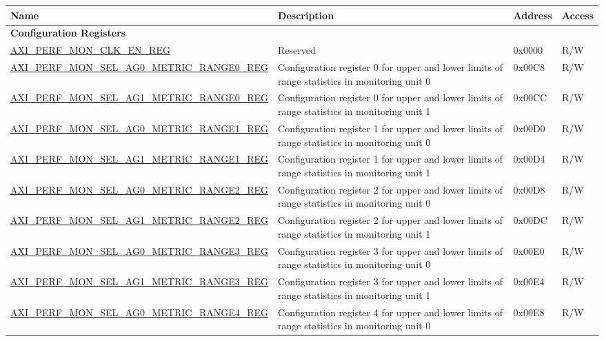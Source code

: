 \begin{longtable}{ | p{9.1cm} | p{5cm} | p{1.3cm} | p{1.4cm} | }
\hline\rowcolor{lightgray}
Name & Description &  Address & Access \\ \hline
\endhead
\multicolumn{4}{|l|}{\textbf{Configuration Registers}} \\ \hline
\hyperref[regdesc:AXIPERFMONCLKENREG]{AXI\_PERF\_MON\_CLK\_EN\_REG} & Reserved & 0x0000 & R/W\\ \hline
\hyperref[regdesc:AXIPERFMONSELAGNMETRICRANGEMREG]{AXI\_PERF\_MON\_SEL\_AG0\_METRIC\_RANGE0\_REG} & Configuration register 0 for upper and lower limits of range statistics in monitoring unit 0 & 0x00C8 & R/W\\ \hline
\hyperref[regdesc:AXIPERFMONSELAGNMETRICRANGEMREG]{AXI\_PERF\_MON\_SEL\_AG1\_METRIC\_RANGE0\_REG} & Configuration register 0 for upper and lower limits of range statistics in monitoring unit 1 & 0x00CC & R/W\\ \hline
\hyperref[regdesc:AXIPERFMONSELAGNMETRICRANGEMREG]{AXI\_PERF\_MON\_SEL\_AG0\_METRIC\_RANGE1\_REG} & Configuration register 1 for upper and lower limits of range statistics in monitoring unit 0 & 0x00D0 & R/W\\ \hline
\hyperref[regdesc:AXIPERFMONSELAGNMETRICRANGEMREG]{AXI\_PERF\_MON\_SEL\_AG1\_METRIC\_RANGE1\_REG} & Configuration register 1 for upper and lower limits of range statistics in monitoring unit 1 & 0x00D4 & R/W\\ \hline
\hyperref[regdesc:AXIPERFMONSELAGNMETRICRANGEMREG]{AXI\_PERF\_MON\_SEL\_AG0\_METRIC\_RANGE2\_REG} & Configuration register 2 for upper and lower limits of range statistics in monitoring unit 0 & 0x00D8 & R/W\\ \hline
\hyperref[regdesc:AXIPERFMONSELAGNMETRICRANGEMREG]{AXI\_PERF\_MON\_SEL\_AG1\_METRIC\_RANGE2\_REG} & Configuration register 2 for upper and lower limits of range statistics in monitoring unit 1 & 0x00DC & R/W\\ \hline
\hyperref[regdesc:AXIPERFMONSELAGNMETRICRANGEMREG]{AXI\_PERF\_MON\_SEL\_AG0\_METRIC\_RANGE3\_REG} & Configuration register 3 for upper and lower limits of range statistics in monitoring unit 0 & 0x00E0 & R/W\\ \hline
\hyperref[regdesc:AXIPERFMONSELAGNMETRICRANGEMREG]{AXI\_PERF\_MON\_SEL\_AG1\_METRIC\_RANGE3\_REG} & Configuration register 3 for upper and lower limits of range statistics in monitoring unit 1 & 0x00E4 & R/W\\ \hline
\hyperref[regdesc:AXIPERFMONSELAGNMETRICRANGEMREG]{AXI\_PERF\_MON\_SEL\_AG0\_METRIC\_RANGE4\_REG} & Configuration register 4 for upper and lower limits of range statistics in monitoring unit 0 & 0x00E8 & R/W\\ \hline

\end{longtable}
